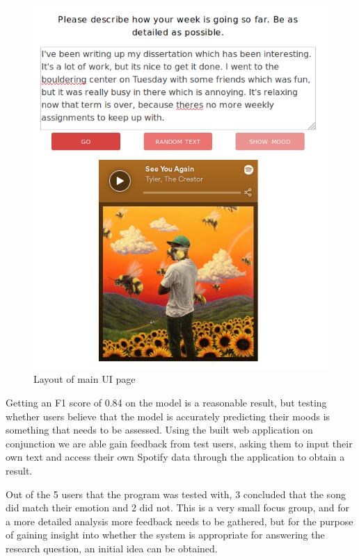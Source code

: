 \begin{figure}[ht]
\centering
\includegraphics[scale=0.4]{implementation/tamara.png}
\caption{Layout of main UI page}
\label{UIlayout}
\end{figure}



Getting an F1 score of 0.84 on the model is a reasonable result, but testing whether users believe that the model is accurately predicting their moods is something that needs to be assessed. Using the built web application on conjunction we are able gain feedback from test users, asking them to input their own text and access their own Spotify data through the application to obtain a result.

Out of the 5 users that the program was tested with, 3 concluded that the song did match their emotion and 2 did not. This is a very small focus group, and for a more detailed analysis more feedback needs to be gathered, but for the purpose of gaining insight into whether the system is appropriate for answering the research question, an initial idea can be obtained.

